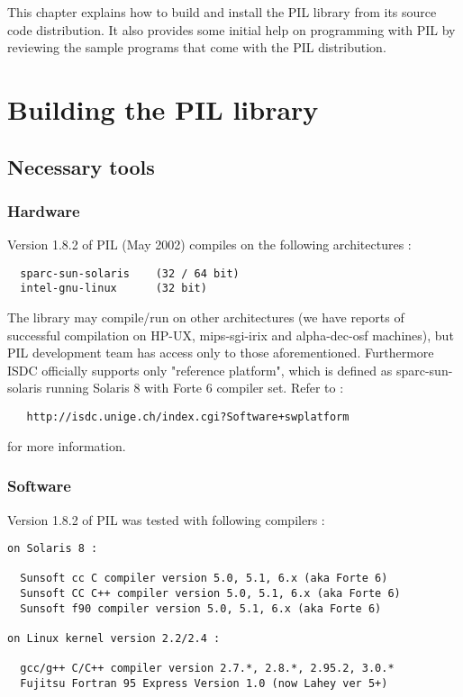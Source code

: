 %

This chapter explains how to build and install the PIL library from its
source code distribution. It also provides some initial help on programming
with PIL by reviewing the sample programs that come with the PIL distribution.

\section{Building the PIL library}

\subsection{Necessary tools}

\subsubsection{Hardware}

Version 1.8.2 of PIL (May 2002) compiles on the following 
architectures :

\begin{verbatim}
  sparc-sun-solaris    (32 / 64 bit)
  intel-gnu-linux      (32 bit)
\end{verbatim}

The library may compile/run on other architectures (we have reports of
successful compilation on HP-UX, mips-sgi-irix and alpha-dec-osf machines), 
but PIL development team has access only to those aforementioned. Furthermore
ISDC officially supports only "reference platform", which is defined
as sparc-sun-solaris running Solaris 8 with Forte 6 compiler set.
Refer to :

\begin{verbatim}
   http://isdc.unige.ch/index.cgi?Software+swplatform
\end{verbatim}

for more information.

\subsubsection{Software}

Version 1.8.2 of PIL was tested with following compilers :

\begin{verbatim}
on Solaris 8 :

  Sunsoft cc C compiler version 5.0, 5.1, 6.x (aka Forte 6)
  Sunsoft CC C++ compiler version 5.0, 5.1, 6.x (aka Forte 6)
  Sunsoft f90 compiler version 5.0, 5.1, 6.x (aka Forte 6)

on Linux kernel version 2.2/2.4 :

  gcc/g++ C/C++ compiler version 2.7.*, 2.8.*, 2.95.2, 3.0.*
  Fujitsu Fortran 95 Express Version 1.0 (now Lahey ver 5+)
\end{verbatim}

